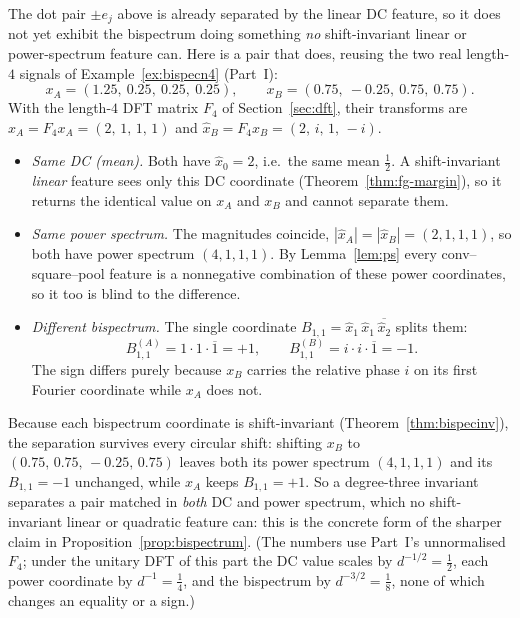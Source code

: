 \begin{example}
\label{ex:bispec-dc}
The dot pair $\pm e_j$ above is already separated by the linear DC feature, so it does not yet
exhibit the bispectrum doing something \emph{no} shift-invariant linear or power-spectrum feature can.
Here is a pair that does, reusing the two real length-$4$ signals of Example~\ref{ex:bispecn4}
(Part~I):
\[
  x_A = (1.25,\ 0.25,\ 0.25,\ 0.25), \qquad
  x_B = (0.75,\ -0.25,\ 0.75,\ 0.75).
\]
With the length-$4$ DFT matrix $F_4$ of Section~\ref{sec:dft}, their transforms are
$\hat x_A = F_4 x_A = (2,\,1,\,1,\,1)$ and $\hat x_B = F_4 x_B = (2,\,i,\,1,\,-i)$.
\begin{itemize}[nosep]
\item \emph{Same DC (mean).} Both have $\hat x_0 = 2$, i.e.\ the same mean $\tfrac12$. A
shift-invariant \emph{linear} feature sees only this DC coordinate (Theorem~\ref{thm:fg-margin}), so
it returns the identical value on $x_A$ and $x_B$ and cannot separate them.
\item \emph{Same power spectrum.} The magnitudes coincide, $|\hat x_A| = |\hat x_B| = (2,1,1,1)$, so
both have power spectrum $(4,1,1,1)$. By Lemma~\ref{lem:ps} every conv--square--pool feature is a
nonnegative combination of these power coordinates, so it too is blind to the difference.
\item \emph{Different bispectrum.} The single coordinate
$B_{1,1} = \hat x_1\,\hat x_1\,\overline{\hat x_2}$ splits them:
\[
  B^{(A)}_{1,1} = 1\cdot 1\cdot \overline{1} = +1,
  \qquad
  B^{(B)}_{1,1} = i\cdot i\cdot \overline{1} = -1 .
\]
The sign differs purely because $x_B$ carries the relative phase $i$ on its first Fourier coordinate
while $x_A$ does not.
\end{itemize}
Because each bispectrum coordinate is shift-invariant (Theorem~\ref{thm:bispecinv}), the separation
survives every circular shift: shifting $x_B$ to $(0.75,\,0.75,\,-0.25,\,0.75)$ leaves both its power
spectrum $(4,1,1,1)$ and its $B_{1,1} = -1$ unchanged, while $x_A$ keeps $B_{1,1} = +1$. So a
degree-three invariant separates a pair matched in \emph{both} DC and power spectrum, which no
shift-invariant linear or quadratic feature can: this is the concrete form of the sharper claim in
Proposition~\ref{prop:bispectrum}. (The numbers use Part~I's unnormalised $F_4$; under the unitary
DFT of this part the DC value scales by $d^{-1/2}=\tfrac12$, each power coordinate by
$d^{-1}=\tfrac14$, and the bispectrum by $d^{-3/2}=\tfrac18$, none of which changes an equality or a
sign.)
\end{example}


